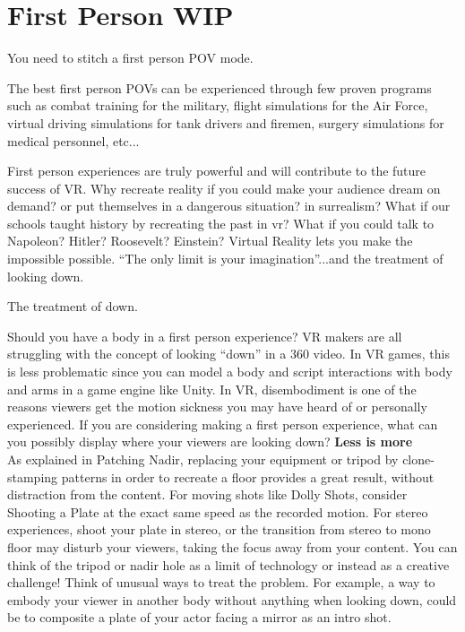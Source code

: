 \chapter{First Person WIP}
\pagecolor{white}
\label{chap:44}
\begin{fullwidth}

\problem

{\large You need to stitch a first person POV mode. \par}

The best first person POVs can be experienced through few proven programs such as combat training for the military, flight simulations for the Air Force, virtual driving simulations for tank drivers and firemen, surgery simulations for medical personnel, etc... 

First person experiences are truly powerful and will contribute to the future success of VR. Why recreate reality if you could make your audience dream on demand? or put themselves in a dangerous situation? in surrealism? What if our schools taught history by recreating the past in vr? What if you could talk to Napoleon? Hitler? Roosevelt? Einstein? Virtual Reality lets you make the impossible possible. “The only limit is your imagination”...and the treatment of looking down.

\solution

{\large The treatment of down. \par}

Should you have a body in a first person experience? VR makers are all struggling with the concept of looking “down” in a 360 video. In VR games, this is less problematic since you can model a body and script interactions with body and arms in a game engine like Unity. In VR, disembodiment is one of the reasons viewers get the motion sickness you may have heard of or personally experienced. If you are considering making a first person experience, what can you possibly display where your viewers are looking down? 
\clearpage
{\bfseries Less is more}
\\
As explained in Patching Nadir, replacing your equipment or tripod by clone-stamping patterns in order to recreate a floor provides a great result, without distraction from the content. For moving shots like Dolly Shots, consider Shooting a Plate at the exact same speed as the recorded motion. For stereo experiences, shoot your plate in stereo, or the transition from stereo to mono floor may disturb your viewers, taking the focus away from your content. You can think of the tripod or nadir hole as a limit of technology or instead as a creative challenge! Think of unusual ways to treat the problem. For example, a way to embody your viewer in another body without anything when looking down, could be to composite a plate of your actor facing a mirror as an intro shot.


\end{fullwidth}
